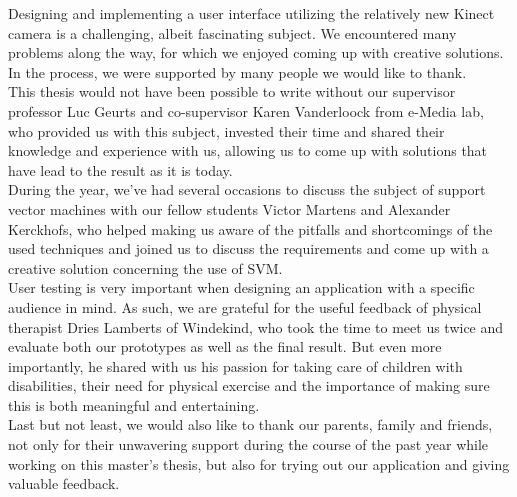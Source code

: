Designing and implementing a user interface utilizing the relatively new Kinect camera is a challenging, albeit fascinating subject. We encountered many problems along the way, for which we enjoyed coming up with creative solutions. In the process, we were supported by many people we would like to thank.\\

This thesis would not have been possible to write without our supervisor professor Luc Geurts and co-supervisor Karen Vanderloock from e-Media lab, who provided us with this subject, invested their time and shared their knowledge and experience with us, allowing us to come up with solutions that have lead to the result as it is today.\\

During the year, we've had several occasions to discuss the subject of support vector machines with our fellow students Victor Martens and Alexander Kerckhofs, who helped making us aware of the pitfalls and shortcomings of the used techniques and joined us to discuss the requirements and come up with a creative solution concerning the use of SVM.\\

User testing is very important when designing an application with a specific audience in mind. As such, we are grateful for the useful feedback of physical therapist Dries Lamberts of Windekind, who took the time to meet us twice and evaluate both our prototypes as well as the final result. But even more importantly, he shared with us his passion for taking care of children with disabilities, their need for physical exercise and the importance of making sure this is both meaningful and entertaining.\\

Last but not least, we would also like to thank our parents, family and friends, not only for their unwavering support during the course of the past year while working on this master's thesis, but also for trying out our application and giving valuable feedback.